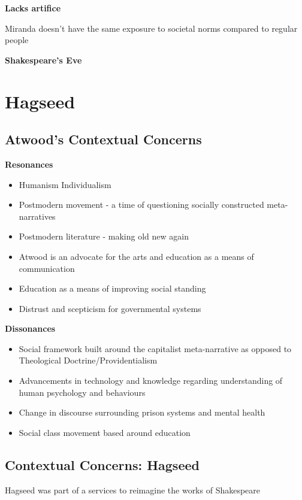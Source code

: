 	\textbf{Lacks artifice}

		Miranda doesn't have the same exposure to societal norms compared to regular people

	\textbf{Shakespeare's Eve}

\section{Hagseed} \label{07/03/2025}

	\subsection{Atwood's Contextual Concerns}
	
		\textbf{Resonances}

		\begin{itemize}
			\item Humanism \rightarrow Individualism
			\item Postmodern movement - a time of questioning socially constructed meta-narratives
			\item Postmodern literature - making old new again
			\item Atwood is an advocate for the arts and education as a means of communication
			\item Education as a means of improving social standing
			\item Distrust and scepticism for governmental systems
		\end{itemize}

		\textbf{Dissonances}

		\begin{itemize}
			\item Social framework built around the capitalist meta-narrative as opposed to Theological Doctrine/Providentialism
			\item Advancements in technology and knowledge regarding understanding of human psychology and behaviours
			\item Change in discourse surrounding prison systems and mental health
			\item Social class movement based around education
		\end{itemize}

	\subsection{Contextual Concerns: Hagseed}
	
		Hagseed was part of a services to reimagine the works of Shakespeare

